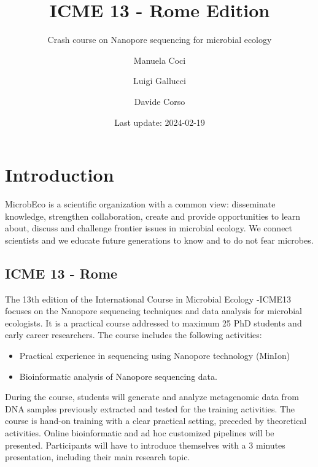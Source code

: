 \documentclass[
]{book}
\title{ICME 13 - Rome Edition}
\subtitle{Crash course on Nanopore sequencing for microbial ecology}
\author{Manuela Coci \and Luigi Gallucci \and Davide Corso}
\date{Last update: 2024-02-19}
\providecommand{\tightlist}{%
  \setlength{\itemsep}{0pt}\setlength{\parskip}{0pt}}
\begin{document}
\maketitle

{
\setcounter{tocdepth}{1}
\tableofcontents
}
\chapter{Introduction}\label{introduction}

MicrobEco is a scientific organization with a common view: disseminate knowledge, strengthen collaboration, create and provide opportunities to learn about, discuss and challenge frontier issues in microbial ecology. We connect scientists and we educate future generations to know and to do not fear microbes.

\section{ICME 13 - Rome}\label{icme-13---rome}

The 13th edition of the International Course in Microbial Ecology -ICME13 focuses on the Nanopore sequencing techniques and data analysis for microbial ecologists. It is a practical course addressed to maximum 25 PhD students and early career researchers. The course includes the following activities:

\begin{itemize}
\tightlist
\item
  Practical experience in sequencing using Nanopore technology (MinIon)
\item
  Bioinformatic analysis of Nanopore sequencing data.
\end{itemize}

During the course, students will generate and analyze metagenomic data from DNA samples previously extracted and tested for the training activities. The course is hand-on training with a clear practical setting, preceded by theoretical activities. Online bioinformatic and ad hoc customized pipelines will be presented. Participants will have to introduce themselves with a 3 minutes presentation, including their main research topic.
\end{document}

